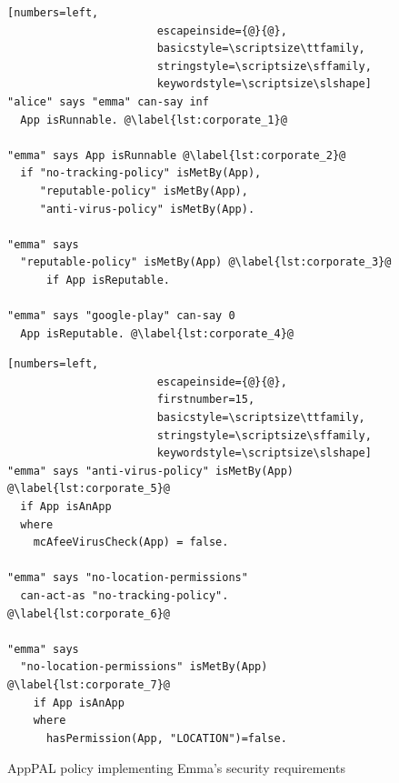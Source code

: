 \documentclass[]{llncs}
\begin{document}
\begin{figure}
  \begin{minipage}[t]{0.5\textwidth}
    \begin{lstlisting}[numbers=left,
                       escapeinside={@}{@},
                       basicstyle=\scriptsize\ttfamily,
                       stringstyle=\scriptsize\sffamily,
                       keywordstyle=\scriptsize\slshape]
"alice" says "emma" can-say inf
  App isRunnable. @\label{lst:corporate_1}@

"emma" says App isRunnable @\label{lst:corporate_2}@
  if "no-tracking-policy" isMetBy(App),
     "reputable-policy" isMetBy(App),
     "anti-virus-policy" isMetBy(App).

"emma" says
  "reputable-policy" isMetBy(App) @\label{lst:corporate_3}@
      if App isReputable.

"emma" says "google-play" can-say 0
  App isReputable. @\label{lst:corporate_4}@
    \end{lstlisting}
  \end{minipage}\begin{minipage}[t]{0.5\textwidth}
    \begin{lstlisting}[numbers=left,
                       escapeinside={@}{@},
                       firstnumber=15,
                       basicstyle=\scriptsize\ttfamily,
                       stringstyle=\scriptsize\sffamily,
                       keywordstyle=\scriptsize\slshape]
"emma" says "anti-virus-policy" isMetBy(App) @\label{lst:corporate_5}@
  if App isAnApp
  where
    mcAfeeVirusCheck(App) = false.

"emma" says "no-location-permissions"
  can-act-as "no-tracking-policy". @\label{lst:corporate_6}@

"emma" says
  "no-location-permissions" isMetBy(App) @\label{lst:corporate_7}@
    if App isAnApp
    where
      hasPermission(App, "LOCATION")=false.
\end{lstlisting}
\end{minipage}
\caption{AppPAL policy implementing Emma's security requirements}
\label{lst:corporate}
\end{figure}
\end{document}
